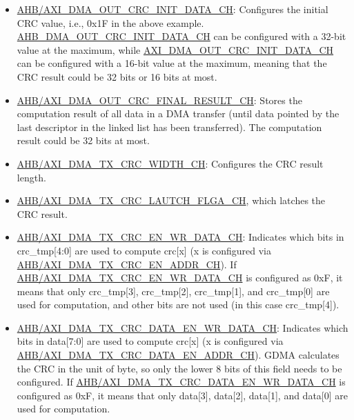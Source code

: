 \documentclass[main\_\_EN.tex]{subfiles}
\begin{document}
\begin{itemize}
\item \hyperref[fielddesc:AHBDMAOUTCRCINITDATACHN]{AHB/AXI\_DMA\_OUT\_CRC\_INIT\_DATA\_CH}: Configures the initial CRC value, i.e., 0x1F in the above example. \hyperref[fielddesc:AHBDMAOUTCRCINITDATACHN]{AHB\_DMA\_OUT\_CRC\_INIT\_DATA\_CH} can be configured with a 32-bit value at the maximum, while \hyperref[fielddesc:AXIDMAOUTCRCINITDATACHN]{AXI\_DMA\_OUT\_CRC\_INIT\_DATA\_CH} can be configured with a 16-bit value at the maximum, meaning that the CRC result could be 32 bits or 16 bits at most.
\item \hyperref[fielddesc:AHBDMAOUTCRCFINALRESULTCHN]{AHB/AXI\_DMA\_OUT\_CRC\_FINAL\_RESULT\_CH}: Stores the computation result of all data in a DMA transfer (until data pointed by the last descriptor in the linked list has been transferred). The computation result could be 32 bits at most.
\item \hyperref[fielddesc:AHBDMATXCRCWIDTHCHN]{AHB/AXI\_DMA\_TX\_CRC\_WIDTH\_CH}: Configures the CRC result length.
\item \hyperref[fielddesc:AHBDMATXCRCLAUTCHFLGACHN]{AHB/AXI\_DMA\_TX\_CRC\_LAUTCH\_FLGA\_CH}, which latches the CRC result.
\item \hyperref[fielddesc:AHBDMATXCRCENWRDATACHN]{AHB/AXI\_DMA\_TX\_CRC\_EN\_WR\_DATA\_CH}: Indicates which bits in crc\_tmp[4:0] are used to compute crc[x] (x is configured via \hyperref[fielddesc:AHBDMATXCRCENADDRCHN]{AHB/AXI\_DMA\_TX\_CRC\_EN\_ADDR\_CH}). If \hyperref[fielddesc:AHBDMATXCRCENWRDATACHN]{AHB/AXI\_DMA\_TX\_CRC\_EN\_WR\_DATA\_CH} is configured as 0xF, it means that only crc\_tmp[3], crc\_tmp[2], crc\_tmp[1], and crc\_tmp[0] are used for computation, and other bits are not used (in this case crc\_tmp[4]).
\item \hyperref[fielddesc:AHBDMATXCRCDATAENWRDATACHN]{AHB/AXI\_DMA\_TX\_CRC\_DATA\_EN\_WR\_DATA\_CH}: Indicates which bits in data[7:0] are used to compute crc[x] (x is configured via \hyperref[fielddesc:AHBDMATXCRCDATAENADDRCHN]{AHB/AXI\_DMA\_TX\_CRC\_DATA\_EN\_ADDR\_CH}). GDMA calculates the CRC in the unit of byte, so only the lower 8 bits of this field needs to be configured. If \hyperref[fielddesc:AHBDMATXCRCDATAENWRDATACHN]{AHB/AXI\_DMA\_TX\_CRC\_DATA\_EN\_WR\_DATA\_CH} is configured as 0xF, it means that only data[3], data[2], data[1], and data[0] are used for computation.
\end{itemize}
\end{document}
